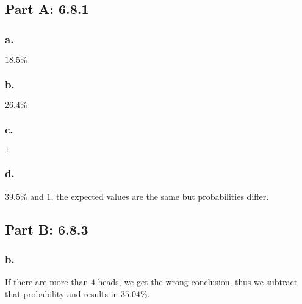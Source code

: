 \documentclass[titlepage]{article}\pagestyle{empty}
\begin{document}
\subsection*{Part A: 6.8.1}
\subsubsection*{a.} $18.5\%$
\subsubsection*{b.} $26.4\%$
\subsubsection*{c.} $1$
\subsubsection*{d.} $39.5\%$ and $1$, the expected values are the same but probabilities differ.
\subsection*{Part B: 6.8.3} 
\subsubsection*{b.} If there are more than $4$ heads, we get the wrong conclusion, thus we subtract that probability and results in $35.04\%$.
\end{document}
